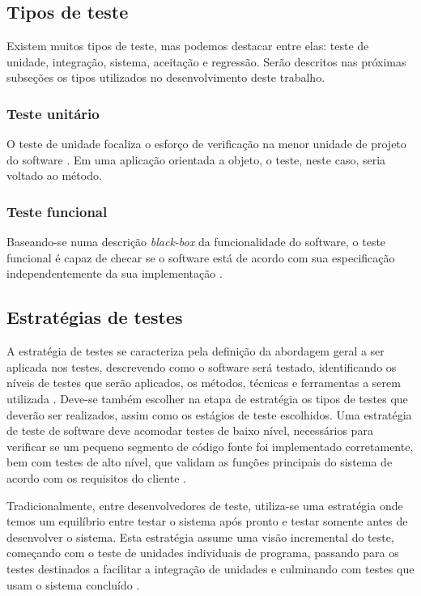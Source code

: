 \documentclass[tg]{mdtufsm}
\begin{document}
\subsection{Tipos de teste}
Existem muitos tipos de teste, mas podemos destacar entre elas: teste de unidade, integração, sistema, aceitação e regressão. Serão descritos nas próximas subseções os tipos utilizados no desenvolvimento deste trabalho.

\subsubsection{Teste unitário}
O teste de unidade focaliza o esforço de verificação na menor unidade de projeto do software \cite{pressman2011engenharia}. Em uma aplicação orientada a objeto, o teste, neste caso, seria voltado ao método.

\subsubsection{Teste funcional}
Baseando-se numa descrição \emph{black-box} da funcionalidade do software, o teste funcional é capaz de checar se o software está de acordo com sua especificação independentemente da sua implementação \cite{fantinato2005autotest}.
 
\subsection{Estratégias de testes}
A estratégia de testes se caracteriza pela definição da abordagem geral a ser aplicada nos testes, descrevendo como o software será testado, identificando os níveis de testes que serão aplicados, os métodos,
técnicas e ferramentas a serem utilizada \cite{rios2006teste}. Deve-se também escolher na etapa de estratégia os tipos de testes que deverão ser realizados, assim como os estágios de teste escolhidos. Uma estratégia de teste de software deve acomodar testes de baixo nível, necessários para verificar se um pequeno segmento de código fonte foi implementado corretamente, bem com testes de alto nível, que validam as funções principais do sistema de acordo com os requisitos do cliente \cite{pressman2011engenharia}.

Tradicionalmente, entre desenvolvedores de teste, utiliza-se uma estratégia onde temos um equilíbrio entre testar o sistema após pronto e testar somente antes de desenvolver o sistema. Esta estratégia assume uma visão incremental do teste, começando com o teste de unidades individuais de programa, passando para os testes destinados a facilitar a integração de unidades e culminando com testes que usam o sistema concluído \cite{pressman2011engenharia}.
\end{document}
